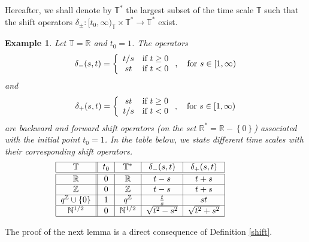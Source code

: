 \documentclass[b5paper,reqno]{amsart}\usepackage{amsfonts}
\theoremstyle{plain}
\newtheorem{example}{Example}
\numberwithin{equation}{section}
\begin{document}
Hereafter, we shall denote by $\mathbb{T}^{\ast}$ the largest subset of the
time scale $\mathbb{T}$ such that the shift operators $\delta_{\pm}:[t_{0},\infty)_{\mathbb{T}}\times\mathbb{T}^{\ast}\rightarrow\mathbb{T}^{\ast}$ exist.

\begin{example}
Let $\mathbb{T=R}$ and $t_{0}=1$. The operators\begin{equation}
\delta_{-}(s,t)=\left\{
\begin{array}
[c]{cc}t/s & \text{if }t\geq0\\
st & \text{if }t<0
\end{array}
\right.  ,\ \ \ \text{for }s\in\lbrack1,\infty) \label{rs1}\end{equation}
and\begin{equation}
\delta_{+}(s,t)=\left\{
\begin{array}
[c]{cc}st & \text{if }t\geq0\\
t/s & \text{if }t<0
\end{array}
\right.  ,\ \ \ \text{for }s\in\lbrack1,\infty) \label{rs2}\end{equation}
are backward and forward shift operators (on the set $\mathbb{R}^{\ast
}=\mathbb{R-}\left\{  0\right\}  $) associated with the initial point
$t_{0}=1$. In the table below, we state different time scales with their
corresponding shift operators.
\[\begin{tabular}
[c]{|c||c|c|c|c|}\hline
$\mathbb{T}$ & $t_{0}$ & $\mathbb{T}^{\ast}$ & $\delta_{-}(s,t)$ & $\delta
_{+}(s,t)$\\\hline\hline
$\mathbb{R}$ & $0$ & $\mathbb{R}$ & $t-s$ & $t+s$\\\hline
$\mathbb{Z}$ & $0$ & $\mathbb{Z}$ & $t-s$ & $t+s$\\\hline
$q^{\mathbb{Z}}\cup\left\{  0\right\}  $ & $1$ & $q^{\mathbb{Z}}$ & $\frac
{t}{s}$ & $st$\\\hline
$\mathbb{N}^{1/2}$ & $0$ & $\mathbb{N}^{1/2}$ & $\sqrt{t^{2}-s^{2}}$ &
$\sqrt{t^{2}+s^{2}}$\\\hline
\end{tabular}
\ \ \ \ \ \ \ \ \ \ \
\]

\end{example}

The proof of the next lemma is a direct consequence of Definition \ref{shift}.
\end{document}
